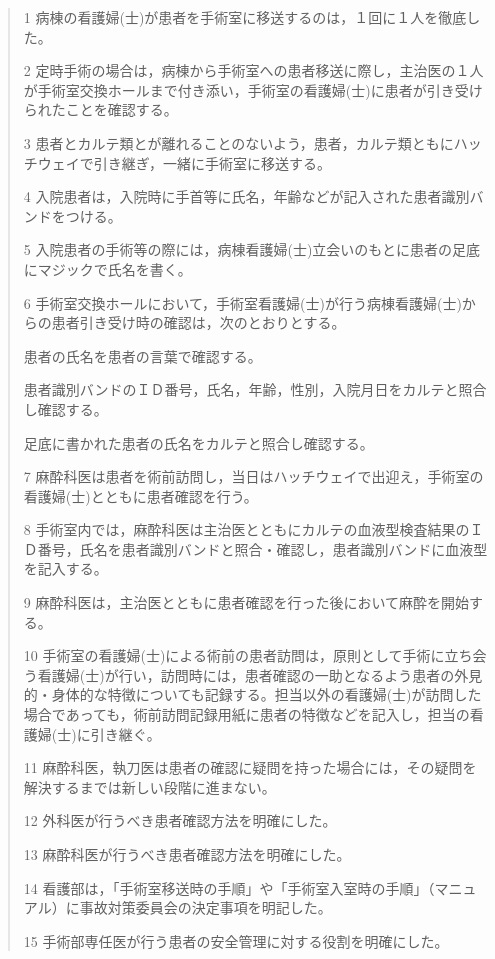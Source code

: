\documentclass[11pt,dvipdfmx,uplatex]{jsarticle}
\begin{document}
\begin{quote}
1 病棟の看護婦(士)が患者を手術室に移送するのは，１回に１人を徹底した。

2 定時手術の場合は，病棟から手術室への患者移送に際し，主治医の１人が手術室交換ホールまで付き添い，手術室の看護婦(士)に患者が引き受けられたことを確認する。

3 患者とカルテ類とが離れることのないよう，患者，カルテ類ともにハッチウェイで引き継ぎ，一緒に手術室に移送する。

4 入院患者は，入院時に手首等に氏名，年齢などが記入された患者識別バンドをつける。

5 入院患者の手術等の際には，病棟看護婦(士)立会いのもとに患者の足底にマジックで氏名を書く。

6 手術室交換ホールにおいて，手術室看護婦(士)が行う病棟看護婦(士)からの患者引き受け時の確認は，次のとおりとする。

    患者の氏名を患者の言葉で確認する。

    患者識別バンドのＩＤ番号，氏名，年齢，性別，入院月日をカルテと照合し確認する。

    足底に書かれた患者の氏名をカルテと照合し確認する。 

7 麻酔科医は患者を術前訪問し，当日はハッチウェイで出迎え，手術室の看護婦(士)とともに患者確認を行う。

8 手術室内では，麻酔科医は主治医とともにカルテの血液型検査結果のＩＤ番号，氏名を患者識別バンドと照合・確認し，患者識別バンドに血液型を記入する。

9 麻酔科医は，主治医とともに患者確認を行った後において麻酔を開始する。

10 手術室の看護婦(士)による術前の患者訪問は，原則として手術に立ち会う看護婦(士)が行い，訪問時には，患者確認の一助となるよう患者の外見的・身体的な特徴についても記録する。担当以外の看護婦(士)が訪問した場合であっても，術前訪問記録用紙に患者の特徴などを記入し，担当の看護婦(士)に引き継ぐ。

11 麻酔科医，執刀医は患者の確認に疑問を持った場合には，その疑問を解決するまでは新しい段階に進まない。

12 外科医が行うべき患者確認方法を明確にした。

13 麻酔科医が行うべき患者確認方法を明確にした。

14 看護部は，「手術室移送時の手順」や「手術室入室時の手順」（マニュアル）に事故対策委員会の決定事項を明記した。

15 手術部専任医が行う患者の安全管理に対する役割を明確にした。
\end{quote}
\end{document}
